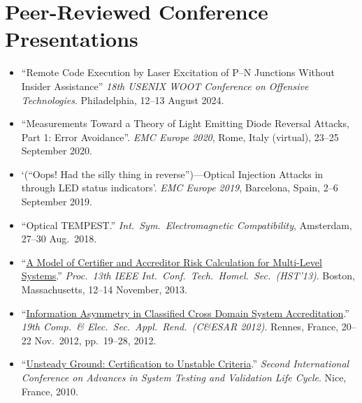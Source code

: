 \vspace{-2mm}
\section*{Peer-Reviewed Conference Presentations}
\vspace{-3mm}

\begin{itemize}
  \item ``Remote Code Execution by Laser Excitation of P--N Junctions Without
  Insider Assistance'' \emph{18th USENIX WOOT Conference on Offensive Technologies}.
  Philadelphia, 12--13 August 2024.\vspace{-2.5mm}

  \item ``Measurements Toward a Theory of Light Emitting Diode Reversal Attacks,
  Part 1: Error Avoidance''. \emph{EMC Europe 2020}, Rome, Italy (virtual),
  23--25 September 2020.\vspace{-2.5mm}

  \item `(``Oops! Had the silly thing in reverse'')---Optical Injection
  Attacks in through LED status indicators'.
  \emph{EMC Europe 2019}, Barcelona, Spain, 2--6 September 2019.\vspace{-2.5mm}

  \item ``Optical TEMPEST.'' \emph{Int.\ Sym.\ Electromagnetic Compatibility},
    Amsterdam, 27--30 Aug.\ 2018.\vspace{-2.5mm}

	\item ``\href{http://ieeexplore.ieee.org/xpls/abs_all.jsp?arnumber=6699004}%
{A Model of Certifier and Accreditor Risk Calculation for Multi-Level
Systems}.'' \emph{Proc.\ 13th IEEE Int.\ Conf.\ Tech.\ Homel.\ Sec.\ (HST'13)}.
Boston, Massachusetts, 12--14 November, 2013.\vspace{-2.5mm}

	\item
``\href{http://cnadocs.com/papers/CESAR2012_information_asymmetry.pdf}%
{Information Asymmetry in Classified Cross Domain System Accreditation}.''
\emph{19th Comp.\ \& Elec.\ Sec.\ Appl.\ Rend.\ (C\&ESAR 2012)}. Rennes,
France, 20--22 Nov.\ 2012, pp.\ 19--28, 2012.\vspace{-2.5mm}

	\item
``\href{http://ieeexplore.ieee.org/xpl/articleDetails.jsp?arnumber=5617171}%
{Unsteady Ground: Certification to Unstable Criteria}.'' \emph{Second
International Conference on Advances in System Testing and Validation Life
Cycle}. Nice, France, 2010. \vspace{2.5mm}


\end{itemize}
